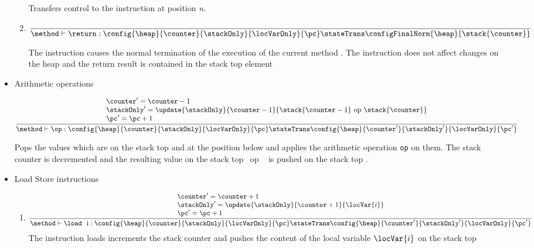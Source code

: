 \begin{itemize}
\begin{enumerate}
   
             Transfers control to the instruction at position \textit{n}.


      \item \return
        $$ \frac{ } 
            {\method \vdash \return :\config{\heap}{\counter}{\stackOnly}{\locVarOnly}{\pc} 
		                    \stateTrans 
                                    \configFinalNorm{\heap}{\stack{\counter}}}     $$

	    The instruction causes the normal termination of the execution of the current method \methodd.
	    The instruction does not affect changes on the heap \heap and the return result is contained in
	    the stack top element \stack{\counter}
      \end{enumerate}

  \item Arithmetic operations 	
        
	   $$ \frac{ \begin{array}{l}
	                   \counter' = \counter - 1 \\
			   \stackOnly' = \update{\stackOnly} {\counter-1}{\stack{\counter-1} \ \rm{op} \ \stack{\counter}} \\
			   \pc' = \pc + 1
	             \end{array}}
		   {\method \vdash  \op :\config{\heap}{\counter}{\stackOnly}{\locVarOnly}{\pc} 
		          \stateTrans 
                          \config{\heap}{\counter'}{\stackOnly' }{\locVarOnly}{\pc'} }  $$ 
		 
 
       Pops the values which are on the stack top \stack{\topStack}  and   at the position below and applies the arithmetic operation \texttt{op}
       on them. The stack counter is decremented and  the resulting  value on the stack top  \ \rm{op} \ \stack{\topStack} is pushed on the stack
       top  . 

  \item Load Store instructions

      \begin{enumerate}
    
	\item \load
	$$ \frac{ \begin{array}{l}
	                \counter' = \counter + 1\\
			\stackOnly' = \update{\stackOnly}{\counter +  1}{ \locVar{i} } \\
			\pc' = \pc + 1
	          \end{array}
	    } 
	    {\method \vdash \load \ \mbox{ \rm i}  : \config{\heap}{\counter}{\stackOnly}{\locVarOnly}{\pc} 
		  \stateTrans 
                  \config{\heap}{\counter'}{\stackOnly'}{\locVarOnly}{\pc'}  } $$ 
            The instruction loads increments the stack counter  \topStack and pushes
	    the content of the local variable $\locVar{i}$ on the stack top 
	    

\end{enumerate}
\end{itemize}
